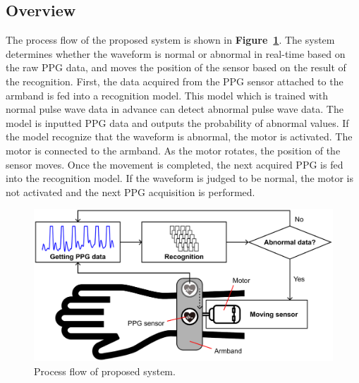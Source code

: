 \documentclass[sigconf]{acmart}
\newcommand\figref[1]{\textbf{Figure~\ref{fig:#1}}}
\begin{document}
\subsection{Overview}
The process flow of the proposed system is shown in \figref{system}. The system determines whether the waveform is normal or abnormal in real-time based on the raw PPG data, and moves the position of the sensor based on the result of the recognition. First, the data acquired from the PPG sensor attached to the armband is fed into a recognition model. This model which is trained with normal pulse wave data in advance can detect abnormal pulse wave data. The model is inputted PPG data and outputs the probability of abnormal values. If the model recognize that the waveform is abnormal, the motor is activated. The motor is connected to the armband. As the motor rotates, the position of the sensor moves. Once the movement is completed, the next acquired PPG is fed into the recognition model. If the waveform is judged to be normal, the motor is not activated and the next PPG acquisition is performed.

\begin{figure}[!t]
  \centering
  \includegraphics[width=1\linewidth]{figures/system.eps}
  \caption{Process flow of proposed system.}
  \label{fig:system}
\end{figure}
\end{document}
